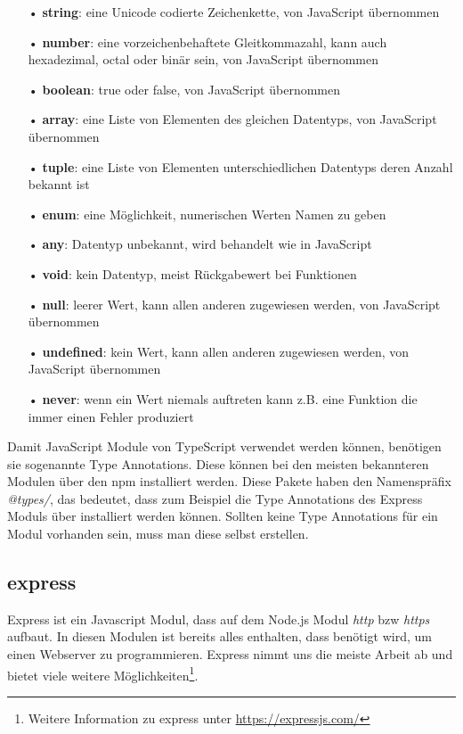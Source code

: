 \begin{itemize}
\item[•] \textbf{string}: eine Unicode codierte Zeichenkette, von JavaScript übernommen
\item[•] \textbf{number}: eine vorzeichenbehaftete Gleitkommazahl, kann auch hexadezimal, octal oder binär sein, von JavaScript übernommen
\item[•] \textbf{boolean}: true oder false, von JavaScript übernommen
\item[•] \textbf{array}: eine Liste von Elementen des gleichen Datentyps, von JavaScript übernommen
\item[•] \textbf{tuple}: eine Liste von Elementen unterschiedlichen Datentyps deren Anzahl bekannt ist
\item[•] \textbf{enum}: eine Möglichkeit, numerischen Werten Namen zu geben
\item[•] \textbf{any}: Datentyp unbekannt, wird behandelt wie in JavaScript
\item[•] \textbf{void}: kein Datentyp, meist Rückgabewert bei Funktionen
\item[•] \textbf{null}: leerer Wert, kann allen anderen zugewiesen werden, von JavaScript übernommen
\item[•] \textbf{undefined}: kein Wert, kann allen anderen zugewiesen werden, von JavaScript übernommen
\item[•] \textbf{never}: wenn ein Wert niemals auftreten kann z.B. eine Funktion die immer einen Fehler produziert
\end{itemize}

Damit JavaScript Module von TypeScript verwendet werden können, benötigen sie sogenannte Type Annotations. Diese können bei den meisten bekannteren Modulen über den \ac{npm} installiert werden. Diese Pakete haben den Namenspräfix \textit{@types/}, das bedeutet, dass zum Beispiel die Type Annotations des Express Moduls über  installiert werden können. Sollten keine Type Annotations für ein Modul vorhanden sein, muss man diese selbst erstellen.

\subsection{express}
\label{sec:vor-express}
Express ist ein Javascript Modul, dass auf dem Node.js Modul \textit{http} bzw \textit{https} aufbaut. In diesen Modulen ist bereits alles enthalten, dass benötigt wird, um einen Webserver zu programmieren. Express nimmt uns die meiste Arbeit ab und bietet viele weitere Möglichkeiten\footnote{Weitere Information zu express unter \url{https://expressjs.com/}}.

